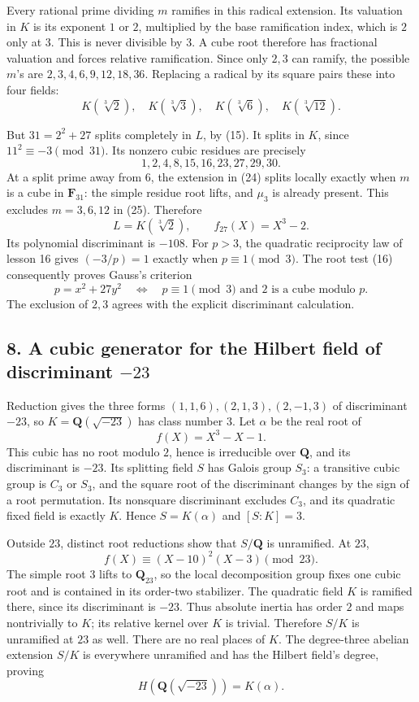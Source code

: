 \documentclass[11pt,a4paper]{article}
\begin{document}
Every rational prime dividing \(m\) ramifies in this radical extension.
Its valuation in \(K\) is its exponent \(1\) or \(2\), multiplied by the
base ramification index, which is \(2\) only at \(3\). This is never
divisible by \(3\). A cube root therefore has fractional valuation and
forces relative ramification. Since only \(2,3\) can ramify, the
possible \(m\)'s are \(2,3,4,6,9,12,18,36\). Replacing a radical by its
square pairs these into four fields: \[
K(\sqrt[3]2),\quad K(\sqrt[3]3),\quad
K(\sqrt[3]6),\quad K(\sqrt[3]{12}).
\tag{25}
\]

But \(31=2^2+27\) splits completely in \(L\), by (15). It splits in
\(K\), since \(11^2\equiv-3\pmod{31}\). Its nonzero cubic residues are
precisely \[
1,2,4,8,15,16,23,27,29,30.
\] At a split prime away from \(6\), the extension in (24) splits
locally exactly when \(m\) is a cube in \(\mathbf F_{31}\): the simple
residue root lifts, and \(\mu_3\) is already present. This excludes
\(m=3,6,12\) in (25). Therefore \[
L=K(\sqrt[3]2),\qquad f_{27}(X)=X^3-2.
\tag{26}
\] Its polynomial discriminant is \(-108\). For \(p>3\), the quadratic
reciprocity law of lesson 16 gives \((-3/p)=1\) exactly when
\(p\equiv1\pmod3\). The root test (16) consequently proves Gauss's
criterion \[
p=x^2+27y^2\quad\Longleftrightarrow\quad
p\equiv1\pmod3\text{ and }2\text{ is a cube modulo }p.
\tag{27}
\] The exclusion of \(2,3\) agrees with the explicit discriminant
calculation.

\subsection{\texorpdfstring{8. A cubic generator for the Hilbert field
of discriminant
\(-23\)}{8. A cubic generator for the Hilbert field of discriminant -23}}\label{a-cubic-generator-for-the-hilbert-field-of-discriminant--23}

Reduction gives the three forms \((1,1,6),(2,1,3),(2,-1,3)\) of
discriminant \(-23\), so \(K=\mathbf Q(\sqrt{-23})\) has class number
\(3\). Let \(\alpha\) be the real root of \[
f(X)=X^3-X-1.
\tag{28}
\] This cubic has no root modulo \(2\), hence is irreducible over
\(\mathbf Q\), and its discriminant is \(-23\). Its splitting field
\(S\) has Galois group \(S_3\): a transitive cubic group is \(C_3\) or
\(S_3\), and the square root of the discriminant changes by the sign of
a root permutation. Its nonsquare discriminant excludes \(C_3\), and its
quadratic fixed field is exactly \(K\). Hence \(S=K(\alpha)\) and
\([S:K]=3\).

Outside \(23\), distinct root reductions show that \(S/\mathbf Q\) is
unramified. At \(23\), \[
f(X)\equiv(X-10)^2(X-3)\pmod{23}.
\] The simple root \(3\) lifts to \(\mathbf Q_{23}\), so the local
decomposition group fixes one cubic root and is contained in its
order-two stabilizer. The quadratic field \(K\) is ramified there, since
its discriminant is \(-23\). Thus absolute inertia has order \(2\) and
maps nontrivially to \(K\); its relative kernel over \(K\) is trivial.
Therefore \(S/K\) is unramified at \(23\) as well. There are no real
places of \(K\). The degree-three abelian extension \(S/K\) is
everywhere unramified and has the Hilbert field's degree, proving \[
H(\mathbf Q(\sqrt{-23}))=K(\alpha).
\tag{29}
\]
\end{document}

